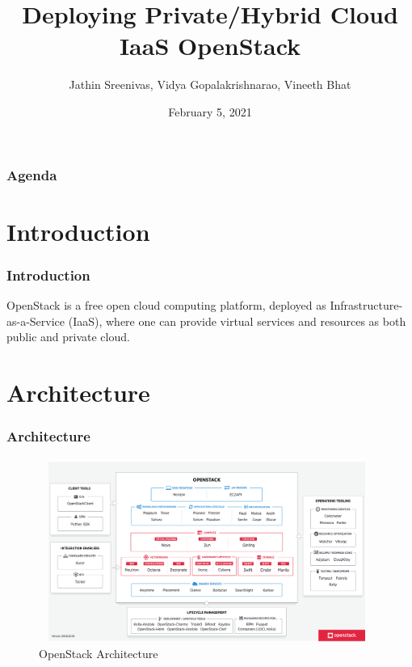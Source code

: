 \documentclass[english,hangout]{beamer}
\title{Deploying Private/Hybrid Cloud \\IaaS OpenStack}
\author{Jathin Sreenivas, Vidya Gopalakrishnarao, Vineeth Bhat}
\institute{Frankfurt University of Applied Sciences}
\date{February 5, 2021}
\begin{document}
\begin{frame}
 \titlepage   
\end{frame}

\begin{frame}
   \frametitle{Agenda}
   \tableofcontents%
\end{frame}

\section{Introduction}
\begin{frame}
    \frametitle{Introduction}
OpenStack is a free open cloud computing platform, deployed as Infrastructure-as-a-Service (IaaS), where one can provide virtual services and resources as both public and private cloud.

    
\end{frame}
\section{Architecture}
\begin{frame}
    \frametitle{Architecture}
    \begin{figure}
        \centerline{\includegraphics[height=6cm,width=11cm]{OpenStack Arch.png}}
        \caption {OpenStack Architecture \cite{b1}}
        \label{openstackArch}
    \end{figure}
\end{frame}
\end{document}
